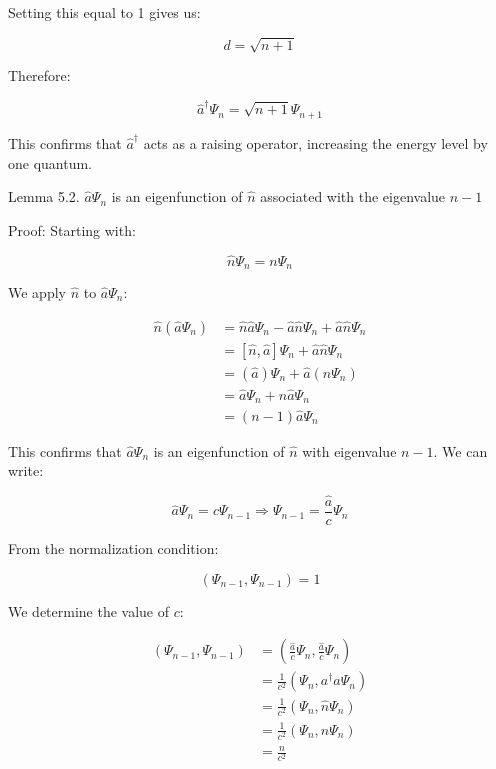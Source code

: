 Setting this equal to 1 gives us:

\begin{equation}
d = \sqrt{n+1}
\end{equation}

Therefore:

\begin{equation}
\hat{a}^\dagger\Psi_n = \sqrt{n+1}\Psi_{n+1}
\end{equation}

This confirms that $\hat{a}^\dagger$ acts as a raising operator, increasing the energy level by one quantum.

Lemma 5.2. $\hat{a}\Psi_n$ is an eigenfunction of $\hat{n}$ associated with the eigenvalue $n-1$

Proof:
Starting with:

\begin{equation}
\hat{n}\Psi_n = n\Psi_n
\end{equation}

We apply $\hat{n}$ to $\hat{a}\Psi_n$:

\begin{align}
\hat{n}(\hat{a}\Psi_n) &= \hat{n}\hat{a}\Psi_n - \hat{a}\hat{n}\Psi_n + \hat{a}\hat{n}\Psi_n \\
&= [\hat{n}, \hat{a}]\Psi_n + \hat{a}\hat{n}\Psi_n \\
&= (\hat{a})\Psi_n + \hat{a}(n\Psi_n)  \\
&= \hat{a}\Psi_n + n\hat{a}\Psi_n \\
&= (n-1)\hat{a}\Psi_n
\end{align}

This confirms that $\hat{a}\Psi_n$ is an eigenfunction of $\hat{n}$ with eigenvalue $n-1$. We can write:

\begin{equation}
\hat{a}\Psi_n = c\Psi_{n-1} \Longrightarrow \Psi_{n-1} = \frac{\hat{a}}{c}\Psi_n
\end{equation}

From the normalization condition:

\begin{equation}
(\Psi_{n-1}, \Psi_{n-1}) = 1
\end{equation}

We determine the value of $c$:

\begin{align}
(\Psi_{n-1}, \Psi_{n-1}) &= \left(\frac{\hat{a}}{c}\Psi_n, \frac{\hat{a}}{c}\Psi_n\right) \\
&= \frac{1}{c^2}(\Psi_n, a^\dagger a\Psi_n) \\
&= \frac{1}{c^2}(\Psi_n, \hat{n}\Psi_n)  \\
&= \frac{1}{c^2}(\Psi_n, n\Psi_n) \\
&= \frac{n}{c^2}
\end{align}

